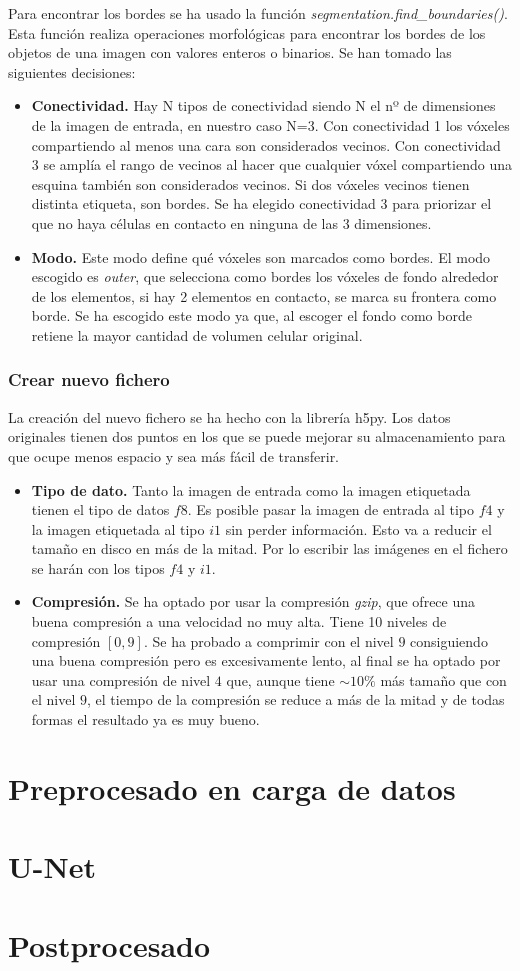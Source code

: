 Para encontrar los bordes se ha usado la función \textit{segmentation.find\_boundaries()}. Esta función realiza operaciones morfológicas para encontrar los bordes de los objetos de una imagen con valores enteros o binarios. Se han tomado las siguientes decisiones:
\begin{itemize}
\item \textbf{Conectividad.} Hay N tipos de conectividad siendo N el nº de dimensiones de la imagen de entrada, en nuestro caso N=3. Con conectividad 1 los vóxeles compartiendo al menos una cara son considerados vecinos. Con conectividad 3 se amplía el rango de vecinos al hacer que cualquier vóxel compartiendo una esquina también son considerados vecinos. Si dos vóxeles vecinos tienen distinta etiqueta, son bordes. Se ha elegido conectividad 3 para priorizar el que no haya células en contacto en ninguna de las 3 dimensiones.
\item \textbf{Modo.} Este modo define qué vóxeles son marcados como bordes. El modo escogido es \textit{outer}, que selecciona como bordes los vóxeles de fondo alrededor de los elementos, si hay 2 elementos en contacto, se marca su frontera como borde. Se ha escogido este modo ya que, al escoger el fondo como borde retiene la mayor cantidad de volumen celular original.
\end{itemize}

\subsubsection{Crear nuevo fichero}

La creación del nuevo fichero se ha hecho con la librería h5py. Los datos originales tienen dos puntos en los que se puede mejorar su almacenamiento para que ocupe menos espacio y sea más fácil de transferir.
\begin{itemize}
\item \textbf{Tipo de dato.} Tanto la imagen de entrada como la imagen etiquetada tienen el tipo de datos $f8$. Es posible pasar la imagen de entrada al tipo $f4$ y la imagen etiquetada al tipo $i1$ sin perder información. Esto va a reducir el tamaño en disco en más de la mitad. Por lo escribir las imágenes en el fichero se harán con los tipos $f4$ y $i1$.
\item \textbf{Compresión.} Se ha optado por usar la compresión \textit{gzip}, que ofrece una buena compresión a una velocidad no muy alta. Tiene 10 niveles de compresión $[0,9]$. Se ha probado a comprimir con el nivel $9$ consiguiendo una buena compresión pero es excesivamente lento, al final se ha optado por usar una compresión de nivel $4$ que, aunque tiene $\sim 10\%$ más tamaño que con el nivel $9$, el tiempo de la compresión se reduce a más de la mitad y de todas formas el resultado ya es muy bueno.
\end{itemize}

\section{Preprocesado en carga de datos}\label{sec:data_loading_processing}

\section{U-Net}\label{sec:data_loading_processing}

\section{Postprocesado}\label{sec:data_loading_processing}
